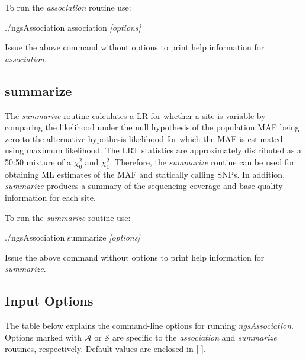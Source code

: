 \documentclass[12pt]{article}
\newenvironment{codeblock}{ \begin{framed}\ttfamily}{ \end{framed} }
\begin{document}
\vspace{5mm}

To run the \textit{association} routine use:
\begin{codeblock}
./ngsAssociation association \textit{[options]}
\end{codeblock}
Issue the above command without options to print help information for \textit{association}.

\subsection{summarize}
The \textit{summarize} routine calculates a LR for whether a site is variable by comparing the likelihood under the null hypothesis of the population MAF being zero to the alternative hypothesis likelihood for which the MAF is estimated using maximum likelihood. The LRT statistics are approximately distributed as a 50:50 mixture of a $\chi^{2}_{0}$ and $\chi^{2}_{1}$. Therefore, the \textit{summarize} routine can be used for obtaining ML estimates of the MAF and statically calling SNPs. In addition, \textit{summarize} produces a summary of the sequencing coverage and base quality information for each site.

\vspace{5mm}

To run the \textit{summarize} routine use:
\begin{codeblock}
./ngsAssociation summarize \textit{[options]}
\end{codeblock}
Issue the above command without options to print help information for \textit{summarize}.

\vspace{5mm}

\subsection{Input Options}

\label{input}

The table below explains the command-line options for running \textit{ngsAssociation}. Options marked with $\mathcal{A}$ or $\mathcal{S}$ are specific to the \textit{association} and \textit{summarize} routines, respectively. Default values are enclosed in {[} {]}.

\vspace{5mm}
\end{document}
